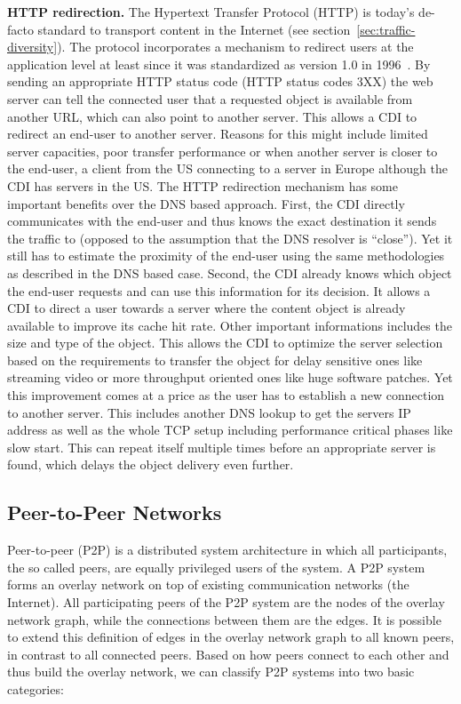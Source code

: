 \vspace{1em} \noindent \textbf{HTTP redirection.} The Hypertext Transfer
Protocol (HTTP) is today's de-facto standard to transport content in the
Internet (see section~\ref{sec:traffic-diversity}). The protocol incorporates a
mechanism to redirect users at the application level at least since it was
standardized as version 1.0 in 1996~\cite{RFC1945}. By sending an appropriate
HTTP status code (HTTP status codes 3XX) the web server can tell the connected
user that a requested object is available from another URL, which can also
point to another server. This allows a CDI to redirect an end-user to another
server. Reasons for this might include limited server capacities, poor transfer
performance or when another server is closer to the end-user, \eg a client from
the US connecting to a server in Europe although the CDI has servers in the US.
The HTTP redirection mechanism has some important benefits over the DNS based
approach. First, the CDI directly communicates with the end-user and thus knows
the exact destination it sends the traffic to (opposed to the assumption that
the DNS resolver is ``close''). Yet it still has to estimate the proximity of
the end-user using the same methodologies as described in the DNS based case.
Second, the CDI already knows which object the end-user requests and can use
this information for its decision. It allows a CDI to direct a user towards a
server where the content object is already available to improve its cache hit
rate. Other important informations includes the size and type of the object.
This allows the CDI to optimize the server selection based on the requirements
to transfer the object \eg for delay sensitive ones like streaming video or
more throughput oriented ones like huge software patches. Yet this improvement
comes at a price as the user has to establish a new connection to another
server. This includes another DNS lookup to get the servers IP address
as well as the whole TCP setup including performance critical phases like slow
start. This can repeat itself multiple times before an appropriate server is
found, which delays the object delivery even further. 

\subsection{Peer-to-Peer Networks}\label{sec:P2P}

Peer-to-peer (P2P) is a distributed system architecture in which all
participants, the so called peers, are equally privileged users of the system.
A P2P system forms an overlay network on top of existing communication networks
(\eg the Internet). All participating peers of the P2P system are the nodes of
the overlay network graph, while the connections between them are the edges. It
is possible to extend this definition of edges in the overlay network graph to
all known peers, in contrast to all connected peers.  Based on how peers
connect to each other and thus build the overlay network, we can classify P2P
systems into two basic categories:


